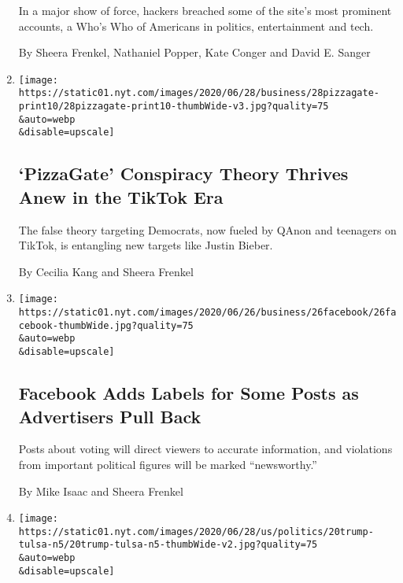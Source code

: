 \begin{enumerate}
  In a major show of force, hackers breached some of the site's most
  prominent accounts, a Who's Who of Americans in politics,
  entertainment and tech.

  By Sheera Frenkel, Nathaniel Popper, Kate Conger and David E. Sanger
\item
  \href{/2020/06/27/technology/pizzagate-justin-bieber-qanon-tiktok.html}{}

  \texttt{[image: https://static01.nyt.com/images/2020/06/28/business/28pizzagate-print10/28pizzagate-print10-thumbWide-v3.jpg?quality=75\\\&auto=webp\\\&disable=upscale]}

  \hypertarget{pizzagate-conspiracy-theory-thrives-anew-in-the-tiktok-era}{%
  \subsection{`PizzaGate' Conspiracy Theory Thrives Anew in the TikTok
  Era}\label{pizzagate-conspiracy-theory-thrives-anew-in-the-tiktok-era}}

  The false theory targeting Democrats, now fueled by QAnon and
  teenagers on TikTok, is entangling new targets like Justin Bieber.

  By Cecilia Kang and Sheera Frenkel
\item
  \href{/2020/06/26/technology/facebook-labels-advertisers.html}{}

  \texttt{[image: https://static01.nyt.com/images/2020/06/26/business/26facebook/26facebook-thumbWide.jpg?quality=75\\\&auto=webp\\\&disable=upscale]}

  \hypertarget{facebook-adds-labels-for-some-posts-as-advertisers-pull-back}{%
  \subsection{Facebook Adds Labels for Some Posts as Advertisers Pull
  Back}\label{facebook-adds-labels-for-some-posts-as-advertisers-pull-back}}

  Posts about voting will direct viewers to accurate information, and
  violations from important political figures will be marked
  ``newsworthy.''

  By Mike Isaac and Sheera Frenkel
\item
  \href{/2020/06/21/style/tiktok-trump-rally-tulsa.html}{}

  \texttt{[image: https://static01.nyt.com/images/2020/06/28/us/politics/20trump-tulsa-n5/20trump-tulsa-n5-thumbWide-v2.jpg?quality=75\\\&auto=webp\\\&disable=upscale]}


\end{enumerate}
